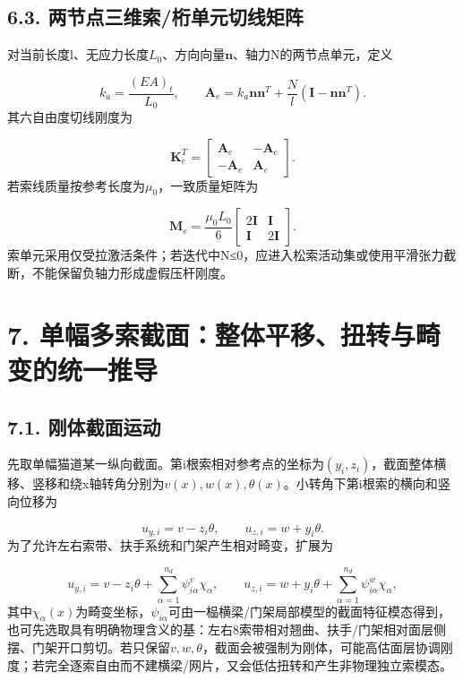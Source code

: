 \documentclass[UTF8,a4paper,11pt,fontset=none]{ctexart}
\begin{document}
\subsection*{6.3. 两节点三维索/桁单元切线矩阵}
对当前长度l、无应力长度\(L_0\)\allowbreak{}、方向向量\(\mathbf n\)\allowbreak{}、轴力N的两节点单元，定义\par
\[
k_a=\frac{(EA)_t}{L_0},
\qquad
\mathbf A_e=k_a\mathbf n\mathbf n^T
+
\frac{N}{l}\left(\mathbf I-\mathbf n\mathbf n^T\right).
\]
其六自由度切线刚度为\par
\[
\mathbf K_e^T=
\begin{bmatrix}
\mathbf A_e&-\mathbf A_e\\
-\mathbf A_e&\mathbf A_e
\end{bmatrix}.
\]
若索线质量按参考长度为\(\mu_0\)\allowbreak{}，一致质量矩阵为\par
\[
\mathbf M_e=
\frac{\mu_0L_0}{6}
\begin{bmatrix}
2\mathbf I&\mathbf I\\
\mathbf I&2\mathbf I
\end{bmatrix}.
\]
索单元采用仅受拉激活条件；若迭代中N≤0，应进入松索活动集或使用平滑张力截断，不能保留负轴力形成虚假压杆刚度。\par
{}
\section*{7. 单幅多索截面：整体平移、扭转与畸变的统一推导}
\subsection*{7.1. 刚体截面运动}
先取单幅猫道某一纵向截面。第i根索相对参考点的坐标为\((y_i,\allowbreak z_i)\)\allowbreak{}，截面整体横移、竖移和绕x轴转角分别为\(v(x),\allowbreak w(x),\allowbreak \theta(x)\)\allowbreak{}。小转角下第i根索的横向和竖向位移为\par
\[
u_{y,i}=v-z_i\theta,
\qquad
u_{z,i}=w+y_i\theta.
\]
为了允许左右索带、扶手系统和门架产生相对畸变，扩展为\par
\[
u_{y,i}=v-z_i\theta+
\sum_{\alpha=1}^{n_d}\psi^{v}_{i\alpha}\chi_\alpha,
\qquad
u_{z,i}=w+y_i\theta+
\sum_{\alpha=1}^{n_d}\psi^{w}_{i\alpha}\chi_\alpha,
\]
其中\(\chi_\alpha(x)\)\allowbreak{}为畸变坐标，\(\psi_{i\alpha}\)\allowbreak{}可由一榀横梁/门架局部模型的截面特征模态得到，也可先选取具有明确物理含义的基：左右8索带相对翘曲、扶手/门架相对面层侧摆、门架开口剪切。若只保留\(v,\allowbreak w,\allowbreak \theta\)\allowbreak{}，截面会被强制为刚体，可能高估面层协调刚度；若完全逐索自由而不建横梁/网片，又会低估扭转和产生非物理独立索模态。\par
{}
\end{document}
